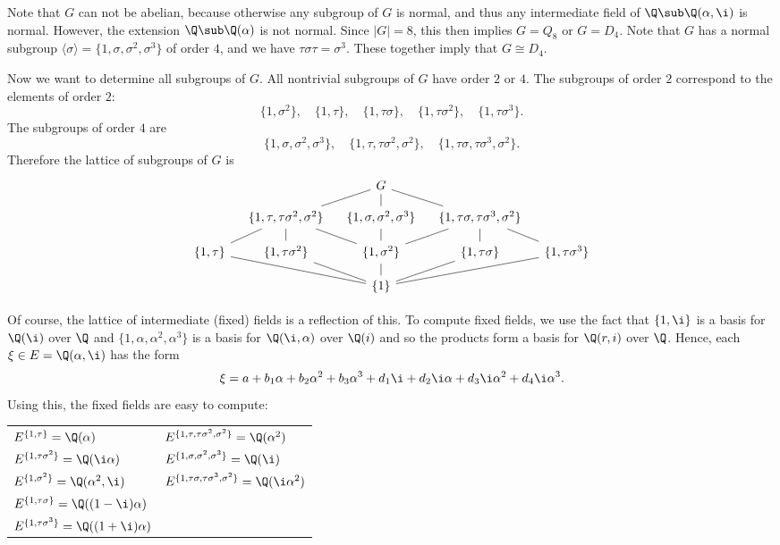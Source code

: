 \begin{example}
Note that $G$ can not be abelian, because otherwise any subgroup of $G$ is normal, and thus any intermediate field of $\Q\sub\Q(\alpha,\i)$ is normal. However, the extension $\Q\sub\Q(\alpha)$ is not normal. Since $|G|=8$, this then implies $G=Q_8$ or $G=D_4$. Note that $G$ has a normal subgroup $\langle\sigma\rangle=\{1,\sigma,\sigma^2,\sigma^3\}$ of order $4$, and we have $\tau\sigma\tau=\sigma^3$. These together imply that $G\cong D_4$.\par
Now we want to determine all subgroups of $G$. All nontrivial subgroups of $G$ have order $2$ or $4$. The subgroups of order $2$ correspond to the elements of order $2$:
\[\{1,\sigma^2\},\quad\{1,\tau\},\quad\{1,\tau\sigma\},\quad\{
1,\tau\sigma^2\},\quad\{1,\tau\sigma^3\}.\]
The subgroups of order $4$ are
\[\{1,\sigma,\sigma^2,\sigma^3\},\quad\{1,\tau,\tau\sigma^2,\sigma^2\},\quad\{1,\tau\sigma,\tau\sigma^3,\sigma^2\}.\]
Therefore the lattice of subgroups of $G$ is
\[\begin{tikzcd}[row sep=10pt,column sep=10pt]
&&G\ar[d,no head]\ar[rd,no head]\ar[ld,no head]&&\\
&\{1,\tau,\tau\sigma^2,\sigma^2\}\ar[d,no head]\ar[rd,no head]\ar[ld,no head]&\{1,\sigma,\sigma^2,\sigma^3\}\ar[d,no head]&\{1,\tau\sigma,\tau\sigma^3,\sigma^2\}\ar[d,no head]\ar[rd,no head]\ar[ld,no head]&\\
\{1,\tau\}&\{1,\tau\sigma^2\}&\{1,\sigma^2\}&\{1,\tau\sigma\}&\{1,\tau\sigma^3\}\\
&&\{1\}\ar[u,no head]\ar[ru,no head]\ar[rru,no head]\ar[lu,no head]\ar[llu,no head]&&
\end{tikzcd}\]

Of course, the lattice of intermediate (fixed) fields is a reflection of this. To compute fixed fields, we use the fact that $\{1,\i\}$ is a basis for $\Q(\i)$ over $\Q$ and $\{1,\alpha,\alpha^2,\alpha^3\}$ is a basis for $\Q(\i,\alpha)$ over $\Q(i)$ and so the products form a basis for $\Q(r,i)$ over $\Q$. Hence, each $\xi\in E=\Q(\alpha,\i)$ has the form
\[\xi=a+b_1\alpha+b_2\alpha^2+b_3\alpha^3+d_1\i+d_2\i\alpha+d_3\i\alpha^2+d_4\i\alpha^3.\]
Using this, the fixed fields are easy to compute:
\begin{table}[htbp]
\renewcommand\arraystretch{1.3}
\centering
\begin{tabular}{l|l}
\hline
$E^{\{1,\tau\}}=\Q(\alpha)$&$E^{\{1,\tau,\tau\sigma^2,\sigma^2\}}=\Q(\alpha^2)$\\
$E^{\{1,\tau\sigma^2\}}=\Q(\i\alpha)$&$E^{\{1,\sigma,\sigma^2,\sigma^3\}}=\Q(\i)$\\
$E^{\{1,\sigma^2\}}=\Q(\alpha^2,\i)$&$E^{\{1,\tau\sigma,\tau\sigma^3,\sigma^2\}}=\Q(\i\alpha^2)$\\
$E^{\{1,\tau\sigma\}}=\Q((1-\i)\alpha)$&\\
$E^{\{1,\tau\sigma^3\}}=\Q((1+\i)\alpha)$&\\
\hline
\end{tabular}
\end{table}


\end{example}
